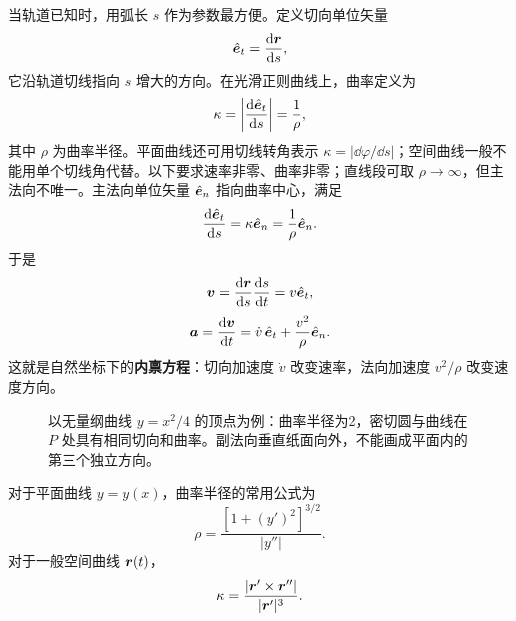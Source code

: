 当轨道已知时，用弧长 $s$ 作为参数最方便。定义切向单位矢量
\begin{equation}
\hat{\boldsymbol{e}}_t=\frac{\mathrm{d} \boldsymbol{r}}{\mathrm{d} s},
\end{equation}
它沿轨道切线指向 $s$ 增大的方向。在光滑正则曲线上，曲率定义为
\begin{equation}
\kappa=\left|\frac{\mathrm{d} \hat{\boldsymbol{e}}_t}{\mathrm{d} s}\right|=\frac{1}{\rho},
\end{equation}
其中 $\rho$ 为曲率半径。平面曲线还可用切线转角表示 $\kappa=|\dd\varphi/\dd s|$；空间曲线一般不能用单个切线角代替。以下要求速率非零、曲率非零；直线段可取 $\rho\to\infty$，但主法向不唯一。主法向单位矢量 $\hat{\boldsymbol{e}}_n$ 指向曲率中心，满足
\begin{equation}
\frac{\mathrm{d} \hat{\boldsymbol{e}}_t}{\mathrm{d} s}=\kappa\hat{\boldsymbol{e}}_n=\frac{1}{\rho}\hat{\boldsymbol{e}}_n .
\end{equation}
于是
\begin{equation}
\boldsymbol{v}=\frac{\mathrm{d} \boldsymbol{r}}{\mathrm{d} s}\frac{\mathrm{d} s}{\mathrm{d} t}=v\hat{\boldsymbol{e}}_t,
\end{equation}
\begin{equation}
\boldsymbol{a}=\frac{\mathrm{d} \boldsymbol{v}}{\mathrm{d} t}=\dot v\,\hat{\boldsymbol{e}}_t+\frac{v^2}{\rho}\hat{\boldsymbol{e}}_n .
\label{eq:natural-acceleration}
\end{equation}
这就是自然坐标下的\textbf{内禀方程}：切向加速度 $\dot v$ 改变速率，法向加速度 $v^2/\rho$ 改变速度方向。

\begin{figure}[htbp]
\centering
{}
\caption{以无量纲曲线 $y=x^2/4$ 的顶点为例：曲率半径为2，密切圆与曲线在 $P$ 处具有相同切向和曲率。副法向垂直纸面向外，不能画成平面内的第三个独立方向。}
\label{fig:natural}
\end{figure}

对于平面曲线 $y=y(x)$，曲率半径的常用公式为
\begin{equation}
\rho=\frac{\left[1+(y')^2\right]^{3/2}}{|y''|}.
\label{eq:curvature-plane}
\end{equation}
对于一般空间曲线 $\boldsymbol{r}(t)$，
\begin{equation}
\kappa=\frac{|\boldsymbol{r}'\times\boldsymbol{r}''|}{|\boldsymbol{r}'|^3}.
\label{eq:curvature-space}
\end{equation}

